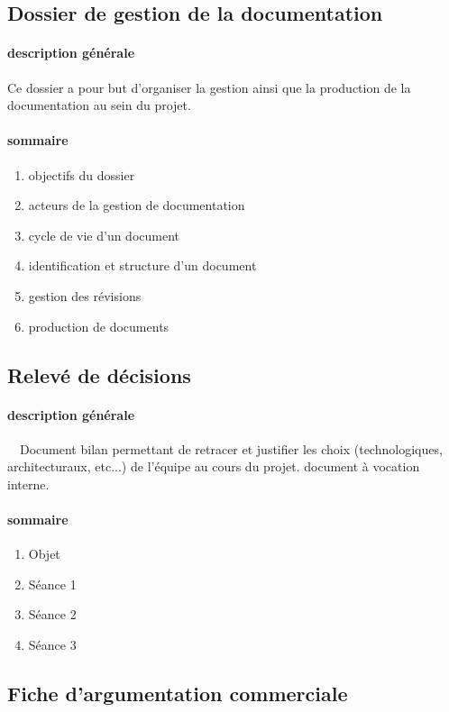 \documentclass{mise_en_page}
\begin{document}
\subsection[Dossier de gestion de la documentation]{Dossier de
gestion de la documentation}
\paragraph[description générale]{description générale}
Ce dossier a pour but d’organiser la gestion ainsi que la production de
la documentation au sein du projet.

\paragraph[sommaire]{sommaire}
\begin{enumerate}
\item objectifs du dossier
\item acteurs de la gestion de documentation
\item cycle de vie d’un document
\item identification et structure d’un document
\item gestion des révisions
\item production de documents
\end{enumerate}
\subsection[Relevé de décisions]{Relevé de décisions}
\paragraph[description générale]{description générale}
\ \ Document bilan permettant de retracer et justifier les choix
(technologiques, architecturaux, etc...) de l’équipe au cours du
projet. document à vocation interne.

\paragraph[sommaire]{sommaire}
\begin{enumerate}
\item Objet
\item Séance 1
\item Séance 2
\item Séance 3
\end{enumerate}
\subsection[Fiche d’argumentation commerciale]{Fiche d’argumentation
commerciale}
\end{document}
